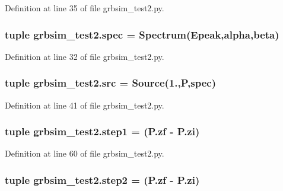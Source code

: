 Definition at line 35 of file grbsim\-\_\-test2.\-py.

\hypertarget{namespacegrbsim__test2_a078846a9103167ba7e6d6f4dd4c48d6e}{
\subsubsection[{spec}]{\setlength{\rightskip}{0pt plus 5cm}tuple grbsim\-\_\-test2.\-spec = {\bf Spectrum}({\bf Epeak},{\bf alpha},{\bf beta})}}\label{namespacegrbsim__test2_a078846a9103167ba7e6d6f4dd4c48d6e}


Definition at line 32 of file grbsim\-\_\-test2.\-py.

\hypertarget{namespacegrbsim__test2_a886d7b207f0901d27f23e86bdfb15ed4}{
\subsubsection[{src}]{\setlength{\rightskip}{0pt plus 5cm}tuple grbsim\-\_\-test2.\-src = {\bf Source}(1.,{\bf P},{\bf spec})}}\label{namespacegrbsim__test2_a886d7b207f0901d27f23e86bdfb15ed4}


Definition at line 41 of file grbsim\-\_\-test2.\-py.

\hypertarget{namespacegrbsim__test2_ace66778df3269bdd4347faf034639aaf}{
\subsubsection[{step1}]{\setlength{\rightskip}{0pt plus 5cm}tuple grbsim\-\_\-test2.\-step1 = (P.\-zf -\/ P.\-zi)}}\label{namespacegrbsim__test2_ace66778df3269bdd4347faf034639aaf}


Definition at line 60 of file grbsim\-\_\-test2.\-py.

\hypertarget{namespacegrbsim__test2_af770ca6f904dd3c99f4f3ff311baef96}{
\subsubsection[{step2}]{\setlength{\rightskip}{0pt plus 5cm}tuple grbsim\-\_\-test2.\-step2 = (P.\-zf -\/ P.\-zi)}}\label{namespacegrbsim__test2_af770ca6f904dd3c99f4f3ff311baef96}


